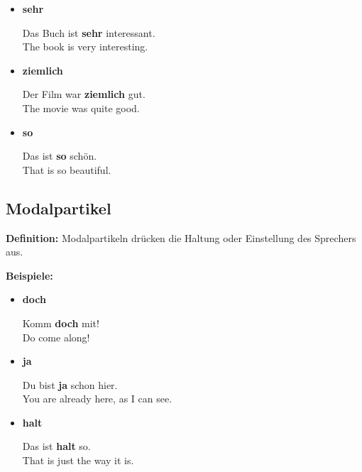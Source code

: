 \documentclass{article}
\begin{document}
            \begin{itemize}
                
                \item \textbf{sehr}
                
                Das Buch ist \textbf{sehr} interessant.\\
                The book is very interesting.
                
                \item \textbf{ziemlich}
                
                Der Film war \textbf{ziemlich} gut.\\
                The movie was quite good.
                
                \item \textbf{so}
                
                Das ist \textbf{so} schön.\\
                That is so beautiful.
            
            \end{itemize}
        
        \subsection{Modalpartikel}
            
            \textbf{Definition:} Modalpartikeln drücken die Haltung oder Einstellung des Sprechers aus.
            
            \textbf{Beispiele:}
            
            \begin{itemize}
                
                \item \textbf{doch}
                
                Komm \textbf{doch} mit!\\
                Do come along!
                
                \item \textbf{ja}
                
                Du bist \textbf{ja} schon hier.\\
                You are already here, as I can see.
                
                \item \textbf{halt}
                
                Das ist \textbf{halt} so.\\
                That is just the way it is.
            
            \end{itemize}
        
\end{document}
